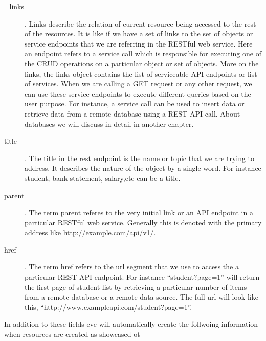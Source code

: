 \begin{description} 

\item [\_links]. Links describe the relation of current resource being
  accessed to the rest of the resources. It is like if we have a set
  of links to the set of objects or service endpoints that we are
  referring in the RESTful web service. Here an endpoint refers to a
  service call which is responsible for executing one of the CRUD
  operations on a particular object or set of objects. More on the
  links, the links object contains the list of serviceable API endpoints
  or list of services.  When we are calling a GET request or any other
  request, we can use these service endpoints to execute different
  queries based on the user purpose.  For instance, a service call can
  be used to insert data or retrieve data from a remote database using
  a REST API call. About databases we will discuss in detail in another
  chapter.

\item [title]. The title in the rest endpoint is the name or topic
  that we are trying to address. It describes the nature of the object
  by a single word. For instance student, bank-statement, salary,etc
  can be a title.

\item [parent]. The term parent referes to the very initial link or an
  API endpoint in a particular RESTful web service. Generally this is
  denoted with the primary address like http://example.com/api/v1/.

\item [href]. The term href refers to the url segment that we use to
  access the a particular REST API endpoint. For instance
  ``student?page=1'' will return the first page of student list by
  retrieving a particular number of items from a remote database or a
  remote data source. The full url will look like this,
  ``http://www.exampleapi.com/student?page=1''.

\end{description}  

In addition to these fields eve will automatically create the
follwoing information when resources are created as showcased ot 



